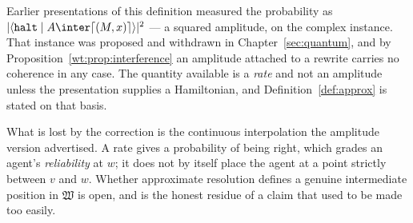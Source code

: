 \begin{remark}
\label{rmk:approx-status}
Earlier presentations of this definition measured the probability as
$|\langle \mathtt{halt} \mid A \inter \lceil (M,x) \rceil \rangle|^2$ ---
a squared amplitude, on the complex instance.
That instance was proposed and withdrawn in
Chapter~\ref{sec:quantum}, and by Proposition~\ref{wt:prop:interference}
an amplitude attached to a rewrite carries no coherence in any case.
The quantity available is a \emph{rate} and not an amplitude unless the
presentation supplies a Hamiltonian, and
Definition~\ref{def:approx} is stated on that basis.

What is lost by the correction is the continuous interpolation the
amplitude version advertised.
A rate gives a probability of being right, which grades an agent's
\emph{reliability} at $w$; it does not by itself place the agent at a
point strictly between $v$ and $w$.
Whether approximate resolution defines a genuine intermediate position in
$\mathfrak{W}$ is open, and is the honest residue of a claim that used to
be made too easily.
\end{remark}

